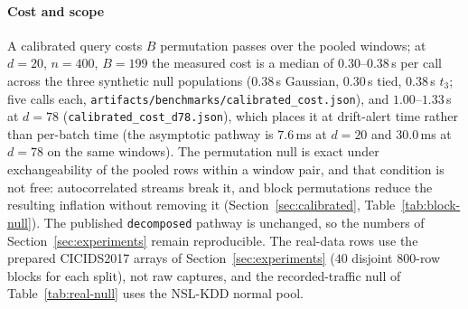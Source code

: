 \begin{table}[!htbp]
\centering
\footnotesize
\setlength{\tabcolsep}{3.5pt}
\caption{False-alarm rate on recorded traffic with nothing changed. Reference and current
windows (400 rows each) are drawn from the same block of the \textup{\textit{normal}}-only NSL-KDD
pool, so every rejection is a false alarm. Nominal level $5\%$, $d = 19$, $B = 199$,
500 trials over 84 distinct blocks. Brackets are $95\%$ intervals over trials; the
block-clustered interval in the artifact is the one to quote on these rows.}
\label{tab:real-null}
\end{table}

\paragraph{Cost and scope}
A calibrated query costs $B$ permutation passes over the pooled windows; at
$d = 20$, $n = 400$, $B = 199$ the measured cost is a median of $0.30$--$0.38$\,s per
call across the three synthetic null populations ($0.38$\,s Gaussian, $0.30$\,s tied,
$0.38$\,s $t_3$; five calls each, \texttt{artifacts/benchmarks/calibrated\_cost.json}),
and $1.00$--$1.33$\,s at $d = 78$ (\texttt{calibrated\_cost\_d78.json}),
which places it at drift-alert time rather than per-batch time (the
asymptotic pathway is $7.6$\,ms at $d = 20$ and $30.0$\,ms at $d = 78$ on the same windows). The permutation null is exact under
exchangeability of the pooled rows within a window pair, and that condition is not free:
autocorrelated streams break it, and block permutations reduce the resulting inflation
without removing it (Section~\ref{sec:calibrated}, Table~\ref{tab:block-null}). The published
\texttt{decomposed} pathway is unchanged, so the numbers of
Section~\ref{sec:experiments} remain reproducible. The real-data rows use the prepared
CICIDS2017 arrays of Section~\ref{sec:experiments} ($40$ disjoint $800$-row blocks for
each split), not raw captures, and the recorded-traffic
null of Table~\ref{tab:real-null} uses the NSL-KDD normal pool.

